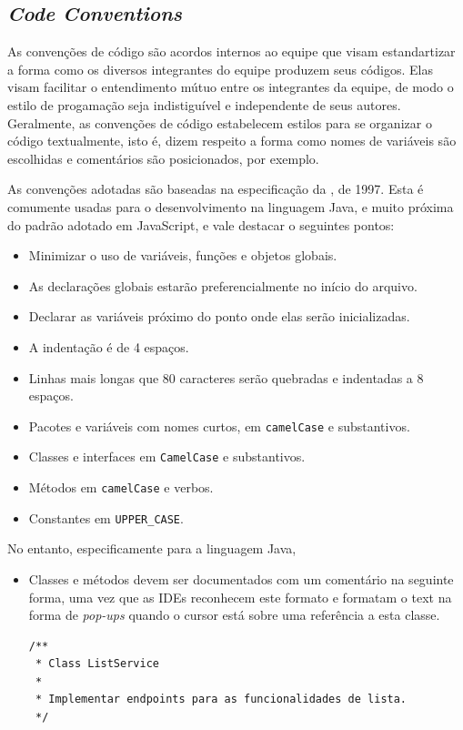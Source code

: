 \subsection{\emph{Code Conventions}}

As convenções de código são acordos internos ao equipe que visam
estandartizar a forma como os diversos integrantes do equipe produzem
seus códigos.  Elas visam facilitar o entendimento mútuo entre os
integrantes da equipe, de modo o estilo de progamação seja indistiguível
e independente de seus autores.  Geralmente, as convenções de código
estabelecem estilos para se organizar o código textualmente, isto é,
dizem respeito a forma como nomes de variáveis são escolhidas e
comentários são posicionados, por exemplo.

As convenções adotadas são baseadas na especificação da
\citeauthor{Oracle1997}, de 1997. Esta é comumente usadas para o
desenvolvimento na linguagem Java, e muito próxima do padrão adotado
em JavaScript, e vale destacar o seguintes pontos:
\begin{itemize}
\item Minimizar o uso de variáveis, funções e objetos globais.
\item As declarações globais estarão preferencialmente no início do arquivo.
\item Declarar as variáveis próximo do ponto onde elas serão inicializadas.
\item A indentação é de 4 espaços.
\item Linhas mais longas que 80 caracteres serão quebradas e
  indentadas a 8 espaços.
\item Pacotes e variáveis com nomes curtos, em \texttt{camelCase} e substantivos.
\item Classes e interfaces em \texttt{CamelCase} e substantivos.
\item Métodos em \texttt{camelCase} e verbos.
\item Constantes em \texttt{UPPER\_CASE}.
\end{itemize}

No entanto, especificamente para a linguagem Java,
\begin{itemize}
\item Classes e métodos devem ser documentados com um comentário na
  seguinte forma, uma vez que as IDEs reconhecem este formato e
  formatam o text na forma de \emph{pop-ups} quando o cursor está
  sobre uma referência a esta classe.
\begin{verbatim}
/**
 * Class ListService
 *
 * Implementar endpoints para as funcionalidades de lista.
 */
\end{verbatim}
\end{itemize}

